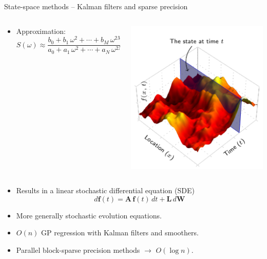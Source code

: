 \documentclass[first=dgreen,second=purple,presentation]{elecslides}
\begin{document}
\begin{frame}{State-space methods -- Kalman filters and sparse precision}
\begin{block}{}
\begin{columns}
\begin{column}{0.5\textwidth}
\begin{itemize}[<+->]
\item Approximation:
{\small
\begin{equation}
  S(\omega) \approx \frac{b_0 + b_1 \, \omega^2 + \cdots + b_M \, \omega^{2M}}
  {a_0 + a_1 \, \omega^2 + \cdots + a_N \, \omega^{2N}}
\nonumber
\end{equation}
}
\end{itemize}
\end{column}
\begin{column}{0.4\textwidth}
\includegraphics[width=0.6\columnwidth]{TikZ-temporal-figure}
\end{column}
\end{columns}
\end{block}
\begin{itemize}[<+->]
\setcounter{enumi}{2}
\item Results in a \alert{linear stochastic differential equation (SDE)}
\begin{equation}
d\mathbf{f}(t) = \mathbf{A} \, \mathbf{f}(t) \, dt + \mathbf{L} \, d\mathbf{W}
\nonumber
\end{equation}

\item More generally \alert{stochastic evolution equations}.

\item $O(n)$ GP regression with \alert{Kalman filters and smoothers}.

\item Parallel \alert{block-sparse precision} methods $\longrightarrow$ $O(\log n)$.
\end{itemize}
\end{frame}
\end{document}
